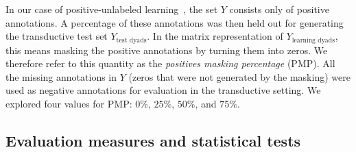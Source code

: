 \documentclass[sn-mathphys-num]{sn-jnl}%
\theoremstyle{thmstyleone}%
\theoremstyle{thmstyletwo}%
\theoremstyle{thmstylethree}%
\begin{document}
In our case of positive-unlabeled learning~\cite{bekker2020learning}, the set $Y$ consists only of positive annotations. A percentage of these annotations was then held out for generating the transductive test set $Y_\text{test dyads}$. In the matrix representation of $Y_\text{learning dyads}$, this means masking the positive annotations by turning them into zeros. We therefore refer to this quantity as the \emph{positives masking percentage} (PMP).
All the missing annotations in $Y$ (zeros that were not generated by the masking) were used as negative annotations for evaluation in the transductive setting. We explored four values for PMP: $0\%$, $25\%$, $50\%$, and $75\%$.

\subsection{Evaluation measures and statistical tests}
\label{sec:evaluation}
\end{document}

